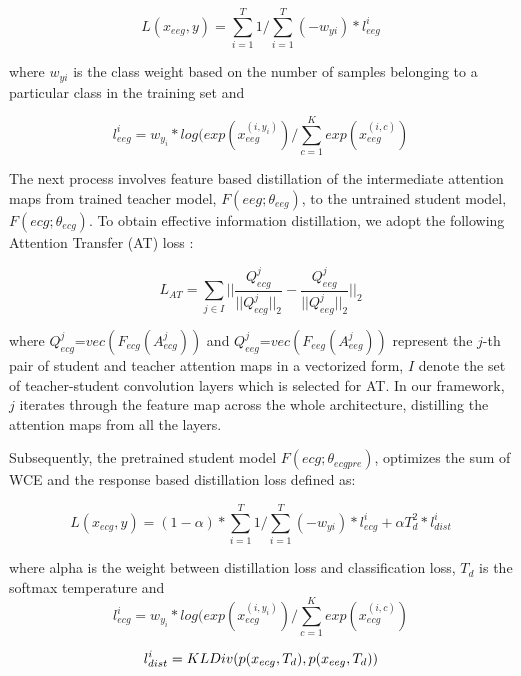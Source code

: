 \documentclass[letterpaper, 10 pt, conference]{ieeeconf}
\begin{document}
\begin{equation} \label{eq:1}
L(x_{eeg}, y) = \sum_{i=1}^{T} 1/\sum_{i=1}^{T} (-w_{yi})  * l_{eeg}^i
\end{equation}

where $w_{yi}$ is the class weight based on the number of samples belonging to a particular class in the training set and

\begin{equation} \label{eq:2}
l_{eeg}^i = w_{y_i} * log(exp(x_{eeg}^{(i,y_i)}) / \sum_{c=1}^{K}  exp(x_{eeg}^{(i,c)})
\end{equation}

The next process involves feature based distillation of the intermediate attention maps from trained teacher model, $F(eeg; \theta_{eeg})$, to the untrained student model, $F(ecg; \theta_{ecg})$. To obtain effective information distillation, we adopt the following Attention Transfer (AT) loss \cite{komodakis2017paying}:

\begin{equation} \label{eq:3}
    L_{AT} = \sum_{j \in I}||\frac{Q_{ecg}^{j}}{||Q_{ecg}^{j}||_{2}} - \frac{Q_{eeg}^{j}}{||Q_{eeg}^{j}||_{2}}||_{2}
\end{equation}

where $Q_{ecg}^{j}$=$vec(F_{ecg}(A_{ecg}^{j}))$ and $Q_{eeg}^{j}$=$vec(F_{eeg}(A_{eeg}^{j}))$ represent the $j$-th pair of student and teacher attention maps in a vectorized form, $I$ denote the set of teacher-student convolution layers which is selected for AT. In our framework, $j$ iterates through the feature map across the whole architecture, distilling the attention maps from all the layers. 

Subsequently, the pretrained student model $F(ecg; \theta_{ecgpre})$, optimizes the sum of WCE and the response based distillation loss defined as:

\begin{equation} \label{eq:4}
L(x_{ecg}, y) = (1-\alpha)*\sum_{i=1}^{T} 1/\sum_{i=1}^{T} (-w_{yi})  * l_{ecg}^i +  \alpha T_d^2 * l_{dist}^i
\end{equation}

where alpha is the weight between distillation loss and classification loss, $T_{d}$ is the softmax temperature and   
\begin{equation} \label{eq:5}
l_{ecg}^i = w_{y_i} * log(exp(x_{ecg}^{(i,y_i)}) / \sum_{c=1}^{K}  exp(x_{ecg}^{(i,c)})
\end{equation}

\begin{equation} \label{eq:6}
l_{dist}^i = KLDiv(p(x_{ecg}, T_d), p(x_{eeg}, T_d))
\vspace{-1.35em}
\end{equation}
\end{document}
